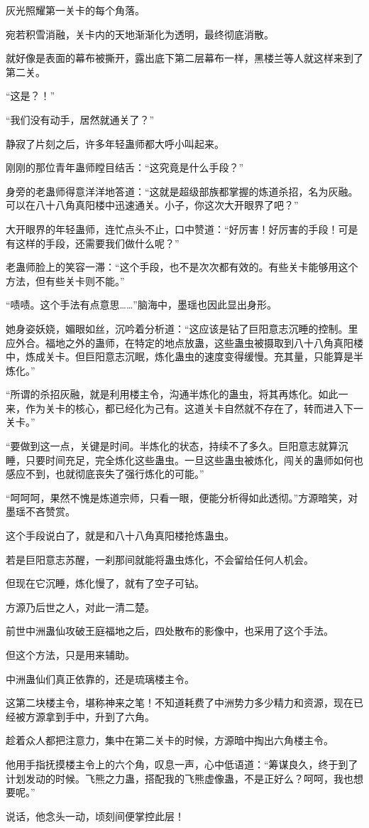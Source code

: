 \begin{this_body}
灰光照耀第一关卡的每个角落。

宛若积雪消融，关卡内的天地渐渐化为透明，最终彻底消散。

就好像是表面的幕布被撕开，露出底下第二层幕布一样，黑楼兰等人就这样来到了第二关。

“这是？！”

“我们没有动手，居然就通关了？”

静寂了片刻之后，许多年轻蛊师都大呼小叫起来。

刚刚的那位青年蛊师瞠目结舌：“这究竟是什么手段？”

身旁的老蛊师得意洋洋地答道：“这就是超级部族都掌握的炼道杀招，名为灰融。可以在八十八角真阳楼中迅速通关。小子，你这次大开眼界了吧？”

大开眼界的年轻蛊师，连忙点头不止，口中赞道：“好厉害！好厉害的手段！可是有这样的手段，还需要我们做什么呢？”

老蛊师脸上的笑容一滞：“这个手段，也不是次次都有效的。有些关卡能够用这个方法，但有些关卡则不能。”

“啧啧。这个手法有点意思……”脑海中，墨瑶也因此显出身形。

她身姿妖娆，媚眼如丝，沉吟着分析道：“这应该是钻了巨阳意志沉睡的控制。里应外合。福地之外的蛊师，在特定的地点放蛊，这些蛊虫被摄取到八十八角真阳楼中，炼成关卡。但巨阳意志沉眠，炼化蛊虫的速度变得缓慢。充其量，只能算是半炼化。”

“所谓的杀招灰融，就是利用楼主令，沟通半炼化的蛊虫，将其再炼化。如此一来，作为关卡的核心，都已经化为己有。这道关卡自然就不存在了，转而进入下一关卡。”

“要做到这一点，关键是时间。半炼化的状态，持续不了多久。巨阳意志就算沉睡，只要时间充足，完全炼化这些蛊虫。一旦这些蛊虫被炼化，闯关的蛊师如何也感应不到，也就彻底丧失了强行炼化的可能。”

“呵呵呵，果然不愧是炼道宗师，只看一眼，便能分析得如此透彻。”方源暗笑，对墨瑶不吝赞赏。

这个手段说白了，就是和八十八角真阳楼抢炼蛊虫。

若是巨阳意志苏醒，一刹那间就能将蛊虫炼化，不会留给任何人机会。

但现在它沉睡，炼化慢了，就有了空子可钻。

方源乃后世之人，对此一清二楚。

前世中洲蛊仙攻破王庭福地之后，四处散布的影像中，也采用了这个手法。

但这个方法，只是用来辅助。

中洲蛊仙们真正依靠的，还是琉璃楼主令。

这第二块楼主令，堪称神来之笔！不知道耗费了中洲势力多少精力和资源，现在已经被方源拿到手中，升到了六角。

趁着众人都把注意力，集中在第二关卡的时候，方源暗中掏出六角楼主令。

他用手指抚摸楼主令上的六个角，叹息一声，心中低语道：“筹谋良久，终于到了计划发动的时候。飞熊之力蛊，搭配我的飞熊虚像蛊，不是正好么？呵呵，我也想要呢。”

说话，他念头一动，顷刻间便掌控此层！

\end{this_body}

